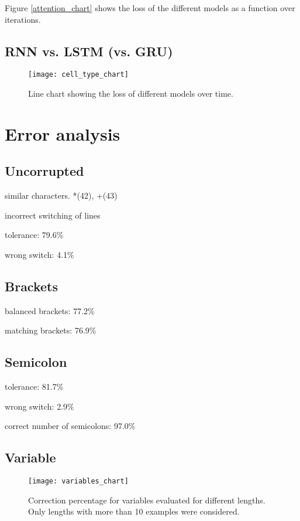 Figure \ref{attention_chart} shows the loss of the different models as a function over iterations.

\subsection{RNN vs. LSTM (vs. GRU)}

\begin{figure}[p]
\centering
\texttt{[image: cell\_type\_chart]}
\caption{Line chart showing the loss of different models over time.}
\label{cell_type_chart}
\end{figure}

\section{Error analysis}

\subsection{Uncorrupted}

similar characters. *(42), +(43)

incorrect switching of lines

tolerance: 79.6\%

wrong switch: 4.1\%

\subsection{Brackets}

balanced brackets: 77.2\%

matching brackets: 76.9\%

\subsection{Semicolon}

tolerance: 81.7\%

wrong switch: 2.9\%

correct number of semicolons: 97.0\%

\subsection{Variable}

\begin{figure}[p]
\centering
\texttt{[image: variables\_chart]}
\caption{Correction percentage for variables evaluated for different lengths. Only lengths with more than 10 examples were considered.}
\label{variables_chart}
\end{figure}

